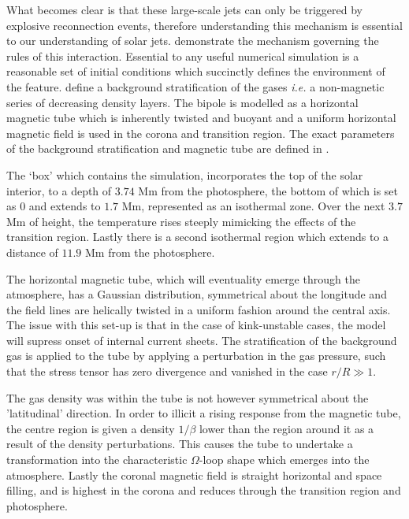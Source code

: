 What becomes clear is that these large-scale jets can only be triggered by explosive reconnection events, therefore understanding this mechanism is essential to our understanding of solar jets.
\cite{Archontis2005} demonstrate the mechanism governing the rules of this interaction.
Essential to any useful numerical simulation is a reasonable set of initial conditions which succinctly defines the environment of the feature.
\cite{Archontis2005} define a background stratification of the gases \emph{i.e.} a non-magnetic series of decreasing density layers. 
The bipole is modelled as a horizontal magnetic tube which is inherently twisted and buoyant and a uniform horizontal magnetic field is used in the corona and transition region.
The exact parameters of the background stratification and magnetic tube are defined in \cite{Fan2001}.

The `box' which contains the simulation, incorporates the top of the solar interior, to a depth of $3.74$ Mm from the photosphere, the bottom of which is set as 0 and extends to $1.7$ Mm, represented as an isothermal zone.
Over the next $3.7$ Mm of height, the temperature rises steeply mimicking the effects of the transition region.
Lastly there is a second isothermal region which extends to a distance of $11.9$ Mm from the photosphere.

The horizontal magnetic tube, which will eventuality emerge through the atmosphere, has a Gaussian distribution, symmetrical about the longitude and the field lines are helically twisted in a uniform fashion around the central axis.
The issue with this set-up is that in the case of kink-unstable cases, the model will supress onset of internal current sheets. 
The stratification of the background gas is applied to the tube by applying a perturbation in the gas pressure, such that the stress tensor has zero divergence and vanished in the case $r/R \gg 1$.

The gas density was within the tube is not however symmetrical about the 'latitudinal' direction.
In order to illicit a rising response from the magnetic tube, the centre region is given a density $1/\beta$ lower than the region around it as a result of the density perturbations.
This causes the tube to undertake a transformation into the characteristic $\Omega$-loop shape which emerges into the atmosphere.
Lastly the coronal magnetic field is straight horizontal and space filling, and is highest in the corona and reduces through the transition region and photosphere.

